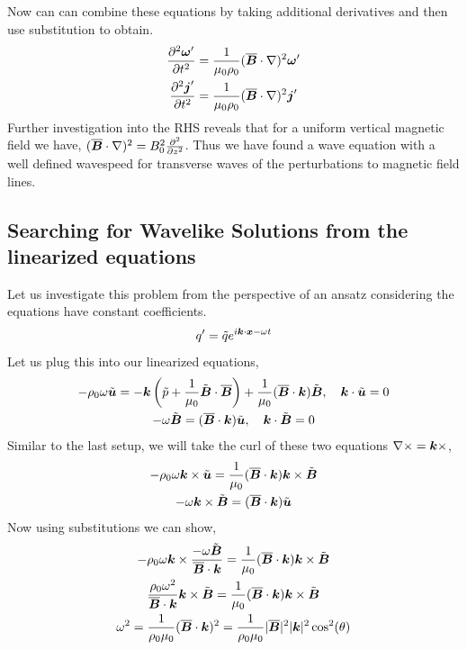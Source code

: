 \documentclass{article}
\begin{document}
Now can can combine these equations by taking additional derivatives and then
use substitution to obtain. 
\begin{gather*}
    \frac{\partial^2 \boldsymbol{\omega}'}{\partial t^2} =
    \frac{1}{\mu_0\rho_0}(\overline{\boldsymbol{B}}\cdot\nabla)^2\boldsymbol{\omega}'\\
    \frac{\partial^2 \boldsymbol{j}'}{\partial t^2} = \frac{1}{\mu_0\rho_0}(\overline{\boldsymbol{B}}\cdot\nabla)^2\boldsymbol{j}'
\end{gather*}
Further investigation into the RHS reveals that for a uniform vertical magnetic
field we have, $(\overline{\boldsymbol{B}}\cdot\nabla)^2 = B_0^2\frac{\partial^2 }{\partial z^2}$. Thus we have
found a wave equation with a well defined wavespeed for transverse waves of the
perturbations to magnetic field lines. 

\subsection{Searching for Wavelike Solutions from the linearized equations}
Let us investigate this problem from the perspective of an ansatz considering
the equations have constant coefficients. 
\begin{gather*}
    q' = \tilde{q}e^{i\boldsymbol{k}\cdot\boldsymbol{x} - \omega t}
\end{gather*}
Let us plug this into our linearized equations, 
\begin{gather*}
    -\rho_0\omega\tilde{\boldsymbol{u}} = -\boldsymbol{k}\left(\tilde{p} +
    \frac{1}{\mu_0}\tilde{\boldsymbol{B}}\cdot\overline{\boldsymbol{B}}\right) +
    \frac{1}{\mu_0}(\overline{\boldsymbol{B}}\cdot\boldsymbol{k})\tilde{\boldsymbol{B}}, \quad
    \boldsymbol{k}\cdot\tilde{\boldsymbol{u}}
    = 0\\
    -\omega\tilde{\boldsymbol{B}} = (\overline{\boldsymbol{B}}\cdot\boldsymbol{k})\tilde{\boldsymbol{u}}, \quad
    \boldsymbol{k}\cdot\tilde{\boldsymbol{B}} = 0
\end{gather*}
Similar to the last setup, we will take the curl of these two equations
$\nabla\times = \boldsymbol{k}\times$, 
\begin{gather*}
    -\rho_0\omega\boldsymbol{k}\times\tilde{\boldsymbol{u}} =
    \frac{1}{\mu_0}(\overline{\boldsymbol{B}}\cdot\boldsymbol{k})\boldsymbol{k}\times\tilde{\boldsymbol{B}}\\
    -\omega\boldsymbol{k}\times\tilde{\boldsymbol{B}} = (\overline{\boldsymbol{B}}\cdot\boldsymbol{k})\tilde{\boldsymbol{u}}
\end{gather*}
Now using substitutions we can show, 
\begin{gather*}
    -\rho_0\omega\boldsymbol{k}\times\frac{-\omega\tilde{\boldsymbol{B}}}{\overline{\boldsymbol{B}}\cdot\boldsymbol{k}} =
    \frac{1}{\mu_0}(\overline{\boldsymbol{B}}\cdot\boldsymbol{k})\boldsymbol{k}\times\tilde{\boldsymbol{B}}\\
    \frac{\rho_0\omega^2}{\overline{\boldsymbol{B}}\cdot\boldsymbol{k}}\boldsymbol{k}\times\tilde{\boldsymbol{B}} =
    \frac{1}{\mu_0}(\overline{\boldsymbol{B}}\cdot\boldsymbol{k})\boldsymbol{k}\times\tilde{\boldsymbol{B}}\\
    \omega^2 = \frac{1}{\rho_0\mu_0}(\overline{\boldsymbol{B}}\cdot\boldsymbol{k})^2 =
    \frac{1}{\rho_0\mu_0}|\overline{\boldsymbol{B}}|^2|\boldsymbol{k}|^2\cos^2(\theta)
\end{gather*}
\end{document}
